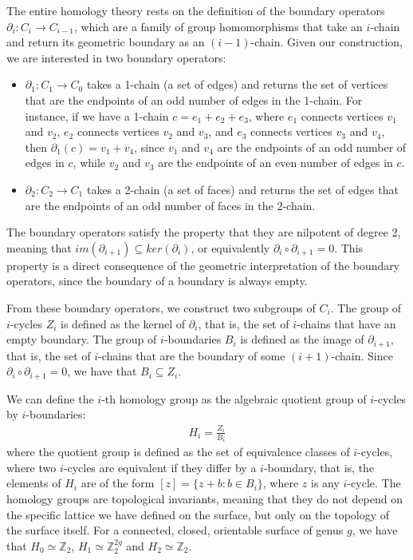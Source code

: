 \documentclass[12pt, twoside, openany]{book}
\begin{document}
The entire homology theory rests on the definition of the boundary operators $\partial_i : C_i \rightarrow C_{i-1}$, which are a family of group homomorphisms that take an $i$-chain and return its geometric boundary as an $(i-1)$-chain. Given our construction, we are interested in two boundary operators:
\begin{itemize}
    \item $\partial_1 : C_1 \rightarrow C_0$ takes a 1-chain (a set of edges) and returns the set of vertices that are the endpoints of an odd number of edges in the 1-chain. For instance, if we have a 1-chain $c = e_1 + e_2 + e_3$, where $e_1$ connects vertices $v_1$ and $v_2$, $e_2$ connects vertices $v_2$ and $v_3$, and $e_3$ connects vertices $v_3$ and $v_4$, then $\partial_1(c) = v_1 + v_4$, since $v_1$ and $v_4$ are the endpoints of an odd number of edges in $c$, while $v_2$ and $v_3$ are the endpoints of an even number of edges in $c$.
    \item $\partial_2 : C_2 \rightarrow C_1$ takes a 2-chain (a set of faces) and returns the set of edges that are the endpoints of an odd number of faces in the 2-chain.
\end{itemize}

The boundary operators satisfy the property that they are nilpotent of degree 2, meaning that $im(\partial_{i+1}) \subseteq ker(\partial_i)$, or equivalently $\partial_i \circ \partial_{i+1} = 0$. This property is a direct consequence of the geometric interpretation of the boundary operators, since the boundary of a boundary is always empty. 

From these boundary operators, we construct two subgroups of $C_i$. The group of $i$-cycles $Z_i$ is defined as the kernel of $\partial_i$, that is, the set of $i$-chains that have an empty boundary. The group of $i$-boundaries $B_i$ is defined as the image of $\partial_{i+1}$, that is, the set of $i$-chains that are the boundary of some $(i+1)$-chain. Since $\partial_i \circ \partial_{i+1} = 0$, we have that $B_i \subseteq Z_i$. 

We can define the $i$-th homology group as the algebraic quotient group of $i$-cycles by $i$-boundaries:
\begin{align}
    H_i = \frac{Z_i}{B_i}
\end{align}
where the quotient group is defined as the set of equivalence classes of $i$-cycles, where two $i$-cycles are equivalent if they differ by a $i$-boundary, that is, the elements of $H_i$ are of the form $[z] = \{ z + b : b \in B_i \}$, where $z$ is any $i$-cycle. The homology groups are topological invariants, meaning that they do not depend on the specific lattice we have defined on the surface, but only on the topology of the surface itself. For a connected, closed, orientable surface of genus $g$, we have that $H_0 \simeq \mathbb{Z}_2$, $H_1 \simeq \mathbb{Z}_2^{2g}$ and $H_2 \simeq \mathbb{Z}_2$. 
\end{document}
